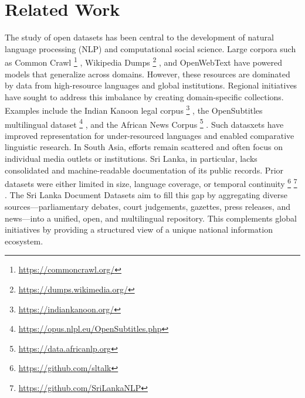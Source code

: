 \documentclass[10pt,a4paper]{article}%
\begin{document}
%
\section{Related Work}%
\label{sec:RelatedWork}%
The study of open datasets has been central to the development of natural language processing (NLP) and computational social science. Large corpora such as Common Crawl%
\footnote{\href{https://commoncrawl.org/}{https://commoncrawl.org/}}%
, Wikipedia Dumps%
\footnote{\href{https://dumps.wikimedia.org/}{https://dumps.wikimedia.org/}}%
, and OpenWebText%
\citep{openwebtext2019}%
have powered models that generalize across domains. However, these resources are dominated by data from high-resource languages and global institutions.%
\newline%
\newline%
Regional initiatives have sought to address this imbalance by creating domain-specific collections. Examples include the Indian Kanoon legal corpus%
\footnote{\href{https://indiankanoon.org/}{https://indiankanoon.org/}}%
, the OpenSubtitles multilingual dataset%
\footnote{\href{https://opus.nlpl.eu/OpenSubtitles.php}{https://opus.nlpl.eu/OpenSubtitles.php}}%
, and the African News Corpus%
\footnote{\href{https://data.africanlp.org}{https://data.africanlp.org}}%
. Such datasxets have improved representation for under-resourced languages and enabled comparative linguistic research.%
\newline%
\newline%
In South Asia, efforts remain scattered and often focus on individual media outlets or institutions. Sri Lanka, in particular, lacks consolidated and machine-readable documentation of its public records. Prior datasets were either limited in size, language coverage, or temporal continuity%
\footnote{\href{https://github.com/sltalk}{https://github.com/sltalk}}%
%
\footnote{\href{https://github.com/SriLankaNLP}{https://github.com/SriLankaNLP}}%
.%
\newline%
\newline%
The Sri Lanka Document Datasets aim to fill this gap by aggregating diverse sources—parliamentary debates, court judgements, gazettes, press releases, and news—into a unified, open, and multilingual repository. This complements global initiatives by providing a structured view of a unique national information ecosystem.%
\newline%
\newline

%
\end{document}
